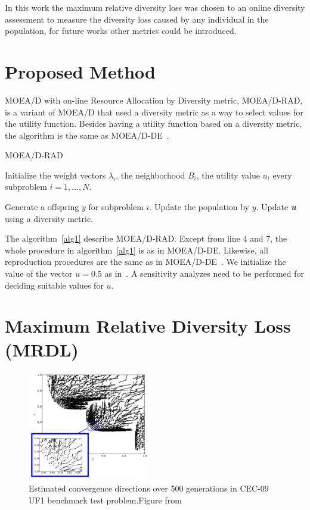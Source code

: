 \documentclass{IEEEtran}
\begin{document}
In this work the maximum relative diversity loss was chosen to an online diversity assessment to measure the diversity loss caused by any individual in the population, for future works other metrics could be introduced.



\section{Proposed Method}

MOEA/D with on-line Resource Allocation by Diversity metric, MOEA/D-RAD, is a variant of MOEA/D that used a diversity metric as a way to select values for the utility function. Besides having a utility function based on a diversity metric, the algorithm is the same as MOEA/D-DE~\cite{li2009multiobjective}.

\begin{algorithm}[h]
	\caption{MOEA/D-RAD}\label{alg1}
	\begin{algorithmic}[1]

	\State Initialize the weight vectors $\lambda_i$, the neighborhood $B_i$, the utility value $u_i$ every subproblem $i=1,...,N$.
		
				\State Generate a offspring $y$ for subproblem $i$.
				\State Update the population by $y$.
			\EndIf
	\EndFor
	\State Update \textit{\textbf{u}} using a diversity metric.
		\EndWhile
	\end{algorithmic}
\end{algorithm}


The algorithm~\ref{alg1} describe MOEA/D-RAD. Except from line 4 and 7, the whole procedure in algorithm~\ref{alg1} is as in MOEA/D-DE. Likewise, all reproduction procedures are the same as in MOEA/D-DE~\cite{li2009multiobjective}. We initialize the value of the vector $u=0.5$ as in~\cite{zhou2016all}. A sensitivity analyzes need to be performed for deciding suitable values for $u$.

\section{Maximum Relative Diversity Loss (MRDL)} 

\begin{figure}[!t]
	\centering
	\includegraphics[width=0.47\textwidth]{img/conv_dir}
	\caption{Estimated convergence directions over 500 generations in CEC-09 UF1 benchmark test problem.Figure from~\cite{gee2015online}}
	\label{fig4}
\end{figure}
\end{document}
